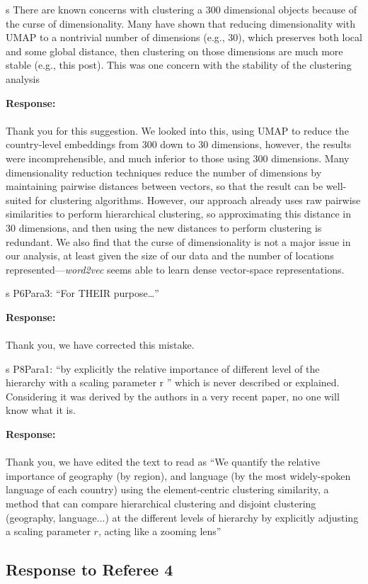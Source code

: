 \documentclass[12pt,draft,a4paper]{article}
\newcounter{comment}[subsection]
\newcommand{\response}[1]{{\noindent \textbf{Response:} \\ \\ \noindent #1}}
\newcommand{\rcomment}[1]{%
\vspace{10pt}
\begin{sectionbox}
s #1
\end{sectionbox}
}
\begin{document}
\rcomment{
	There are known concerns with clustering a 300 dimensional objects because of the curse of
	dimensionality. Many have shown that reducing dimensionality with UMAP to a nontrivial
	number of dimensions (e.g., 30), which preserves both local and some global distance, then
	clustering on those dimensions are much more stable (e.g., this post). This was one
	concern with the stability of the clustering analysis


}

\response{Thank you for this suggestion.
	We looked into this, using UMAP to reduce the country-level embeddings from 300 down to 30 dimensions, however, the results were incomprehensible, and much inferior to those using 300 dimensions.
	Many dimensionality reduction techniques reduce the number of dimensions by maintaining pairwise distances between vectors, so that the result can be well-suited for clustering algorithms.
	However, our approach already uses raw pairwise similarities to perform hierarchical clustering, so approximating this distance in 30 dimensions, and then using the new distances to perform clustering is redundant.
	We also find that the curse of dimensionality is not a major issue in our analysis, at least given the size of our data and the number of locations represented---\textit{word2vec} seems able to learn dense vector-space representations.
}

\rcomment{
	P6Para3: “For THEIR purpose…”
}

\response{Thank you, we have corrected this mistake.
}

\rcomment{
	P8Para1: “by explicitly the relative importance of different level of the hierarchy with a scaling parameter r ” which is never described or explained. Considering it was derived by the authors in a very recent paper, no one will know what it is.
}

\response{Thank you, we have edited the text to read as “We quantify the relative importance of geography (by region), and language (by the most widely-spoken language of each country) using the element-centric clustering similarity, a method that can compare hierarchical clustering and disjoint clustering (geography, language...) at the different levels of hierarchy by explicitly adjusting a scaling parameter $r$, acting like a zooming lens”
}


%
%
\clearpage
\setcounter{section}{3}
\subsection{Response to Referee 4}
\setcounter{section}{4}
\end{document}
